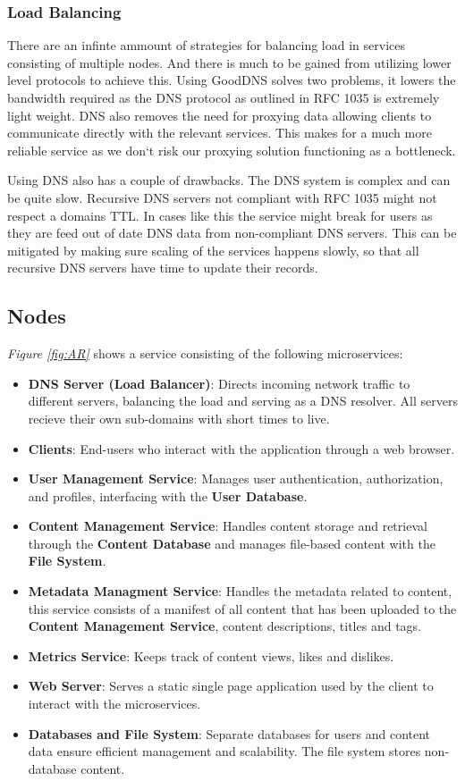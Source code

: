 \documentclass[12pt]{article}
\begin{document}
\subsubsection{Load Balancing}
There are an infinte ammount of strategies for balancing load in services consisting of multiple nodes.
And there is much to be gained from utilizing lower level protocols to achieve this. Using GoodDNS solves
two problems, it lowers the bandwidth required as the DNS protocol as outlined in RFC 1035 is extremely light weight.
DNS also removes the need for proxying data allowing clients to communicate directly with the relevant services.
This makes for a much more reliable service as we don`t risk our proxying solution functioning as a bottleneck.

Using DNS also has a couple of drawbacks. The DNS system is complex and can be quite slow.
Recursive DNS servers not compliant with RFC 1035 might not respect a domains TTL.
In cases like this the service might break for users as they are feed out of date DNS data
from non-compliant DNS servers. This can be mitigated by making sure scaling of the services
happens slowly, so that all recursive DNS servers have time to update their records.

\subsection{Nodes}

\textit{Figure \ref{fig:AR}} shows a service consisting of the following microservices:

\begin{itemize}
    \item \textbf{DNS Server (Load Balancer)}: Directs incoming network traffic to different servers, 
    balancing the load and serving as a DNS resolver. All servers recieve their own sub-domains with short times to live.
    \item \textbf{Clients}: End-users who interact with the application through a web browser.
    \item \textbf{User Management Service}: Manages user authentication, authorization, and profiles, interfacing with the \textbf{User Database}.
    \item \textbf{Content Management Service}: Handles content storage and retrieval through the \textbf{Content Database} and manages file-based content with the \textbf{File System}.
    \item \textbf{Metadata Managment Service}: Handles the metadata related to content, this service consists of a manifest of all content that has been uploaded to the \textbf{Content Management Service}, content descriptions, titles and tags.
    \item \textbf{Metrics Service}: Keeps track of content views, likes and dislikes. 
    \item \textbf{Web Server}: Serves a static single page application used by the client to interact with the microservices.
    \item \textbf{Databases and File System}: Separate databases for users and content data ensure efficient management and scalability. The file system stores non-database content.
\end{itemize}
\end{document}
